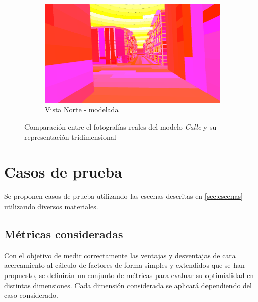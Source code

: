 \begin{figure}[H]
	\begin{subfigure}{0.475\textwidth}
		\includegraphics[width=1\linewidth]{assets/streetmodel2}
		\caption{Vista Norte - modelada}
	\end{subfigure}
	\caption{Comparación entre el fotografías reales del modelo \textit{Calle} y su representación tridimensional}
	\label{img:streetcomp}
\end{figure}

\section{Casos de prueba}
\label{sec:pruebas}

Se proponen casos de prueba utilizando las escenas descritas en \ref{sec:escenas} utilizando diversos materiales.

\subsection{Métricas consideradas}
\label{metricasestablecidas}
Con el objetivo de medir correctamente las ventajas y desventajas de cara acercamiento al cálculo de factores de forma simples y extendidos que se han propuesto, se definirán un conjunto de métricas para evaluar su optimialidad en distintas dimensiones. Cada dimensión considerada se aplicará dependiendo del caso considerado.


